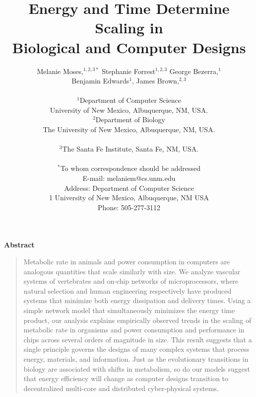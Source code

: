 \documentclass[12pt]{article}
\title{Energy and Time Determine Scaling in \\Biological and Computer Designs}
\author
{Melanie Moses,$^{1,2,3\ast}$ Stephanie Forrest$^{1,2,3}$ George Bezerra,$^{1}$ \\Benjamin Edwards$^{1}$, James Brown,$^{2,3}$ \\
\\
\normalsize{$^{1}$Department of Computer Science}\\
\normalsize{University of New Mexico, Albuquerque, NM, USA.}\\
\normalsize{$^{2}$Department of Biology}\\
\normalsize{The University of New Mexico, Albuquerque, NM, USA.}\\
\\
\normalsize{$^{3}$The Santa Fe Institute, Santa Fe, NM, USA.}\\
\\
\normalsize{$^\ast$To whom correspondence should be addressed}\\
\normalsize{E-mail: melaniem@cs.unm.edu}\\
\normalsize{Address: Department of Computer Science}\\
\normalsize{1 University of New Mexico, Albuquerque, NM USA}\\
\normalsize{Phone: 505-277-3112}\\
}
\newenvironment{sciabstract}{%
\begin{quote} \bf}
{\end{quote}}
\begin{document}
 

\newenvironment{caseof}{\setcounter{casenum}{1}}{\vskip.5\baselineskip}
\newcommand{\case}[2]{\vskip.5\baselineskip\par\noindent {\bfseries Case
\arabic{casenum}:} #1: #2\addtocounter{casenum}{1}}


\baselineskip24pt


\maketitle 


\newpage


\centerline{\Large{\bf Abstract}}

\begin{sciabstract}

  Metabolic rate in animals and power consumption in computers are analogous
  quantities that scale similarly with size.  We analyze vascular systems of
  vertebrates and on-chip networks of microprocessors, where natural selection
  and human engineering respectively have produced systems that minimize both energy dissipation
  and delivery times.   
  Using a simple network model that simultaneously minimizes the energy time product, our analysis explains
  empirically observed trends in the scaling of metabolic rate in organisms and
  power consumption and performance in chips across several orders of magnitude
  in size.  This result suggests that a single principle governs the designs of
  many complex systems that process energy, materials, and information. Just as
  the evolutionary transitions in biology are associated with shifts in
  metabolism, so do our models suggest that energy efficiency will change
  as computer designs transition to decentralized multi-core and
  distributed cyber-physical systems.

\end{sciabstract}
\end{document}
